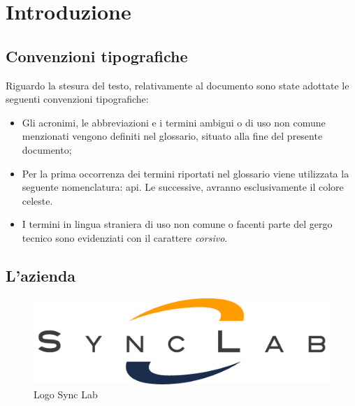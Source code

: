 
\chapter{Introduzione}
\label{cap:introduzione}



\vfill

\section{Convenzioni tipografiche}

Riguardo la stesura del testo, relativamente al documento sono state adottate le seguenti convenzioni tipografiche:
\begin{itemize}
	\item Gli acronimi, le abbreviazioni e i termini ambigui o di uso non comune menzionati vengono definiti nel glossario, situato alla fine del presente documento;
	\item Per la prima occorrenza dei termini riportati nel glossario viene utilizzata la seguente nomenclatura: \gls{api}\gloss. Le successive, avranno esclusivamente il colore celeste.
	\item I termini in lingua straniera di uso non comune o facenti parte del gergo tecnico sono evidenziati con il carattere \emph{corsivo}.
\end{itemize}

\vfill

\clearpage

\section{L'azienda}

\begin{figure}[H]
	\centering
	\includegraphics[width=\textwidth/2]{immagini/logo-synclab.png}
	\caption{Logo Sync Lab}
\end{figure}

